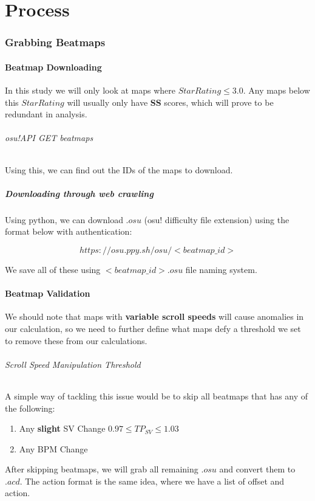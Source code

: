 

\part{Process}

\section{Grabbing Beatmaps}

\subsection{Beatmap Downloading}

In this study we will only look at maps where $ Star Rating \leq 3.0 $. Any maps below this $Star Rating$ will usually only have \textbf{SS} scores, which will prove to be redundant in analysis.

\paragraph{osu!API GET beatmaps} Using this, we can find out the IDs of the maps to download.

\subsubsection{Downloading through web crawling}

Using python, we can download $.osu$ (osu! difficulty file extension) using the format below with authentication:

$$https://osu.ppy.sh/osu/<beatmap\_id>$$

We save all of these using $<beatmap\_id>.osu$ file naming system.

\subsection{Beatmap Validation}

We should note that maps with \textbf{variable scroll speeds} will cause anomalies in our calculation, so we need to further define what maps defy a threshold we set to remove these from our calculations.

\paragraph{Scroll Speed Manipulation Threshold}
A simple way of tackling this issue would be to skip all beatmaps that has any of the following:
\begin{enumerate}
	\item Any \textbf{slight} SV Change $ 0.97 \leq TP_{SV} \leq 1.03 $
	\item Any BPM Change
\end{enumerate}

After skipping beatmaps, we will grab all remaining $.osu$ and convert them to $.acd$. The action format is the same idea, where we have a list of offset and action.


